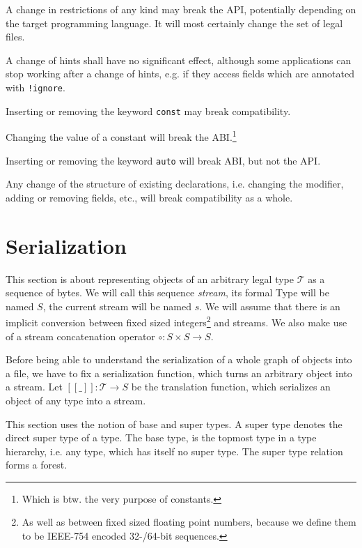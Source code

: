 \documentclass[a4paper,10pt]{article}
\newcommand{\den}[1]{[\![#1]\!]}
\begin{document}
A change in restrictions of any kind may break the API, potentially depending on the target programming language. It will most certainly change the set of legal files.

A change of hints shall have no significant effect, although some applications can stop working after a change of hints, e.g. if they access fields which are annotated with \verb/!ignore/.

Inserting or removing the keyword \texttt{const} may break compatibility.

Changing the value of a constant will break the ABI.\footnote{Which is btw. the very purpose of constants.}

Inserting or removing the keyword \texttt{auto} will break ABI, but not the API.

Any change of the structure of existing declarations, i.e. changing the modifier, adding or removing fields, etc., will break compatibility as a whole.

\section{Serialization}

This section is about representing objects of an arbitrary legal type $\mathcal{T}$ as a sequence of bytes. We will call this sequence \textit{stream}, its formal Type will be named $S$, the current stream will be named $s$. We will assume that there is an implicit conversion between fixed sized integers\footnote{As well as between fixed sized floating point numbers, because we define them to be IEEE-754 encoded 32-/64-bit sequences.} and streams. We also make use of a stream concatenation operator $\circ : S \times S → S$.

Before being able to understand the serialization of a whole graph of objects into a file, we have to fix a serialization function, which turns an arbitrary object into a stream. Let $\den{\_}:\mathcal{T} → S$ be the translation function, which serializes an object of any type into a stream.

This section uses the notion of base and super types. A super type denotes the direct super type of a type. The base type, is the topmost type in a type hierarchy, i.e. any type, which has itself no super type.
The super type relation forms a forest.
\end{document}
